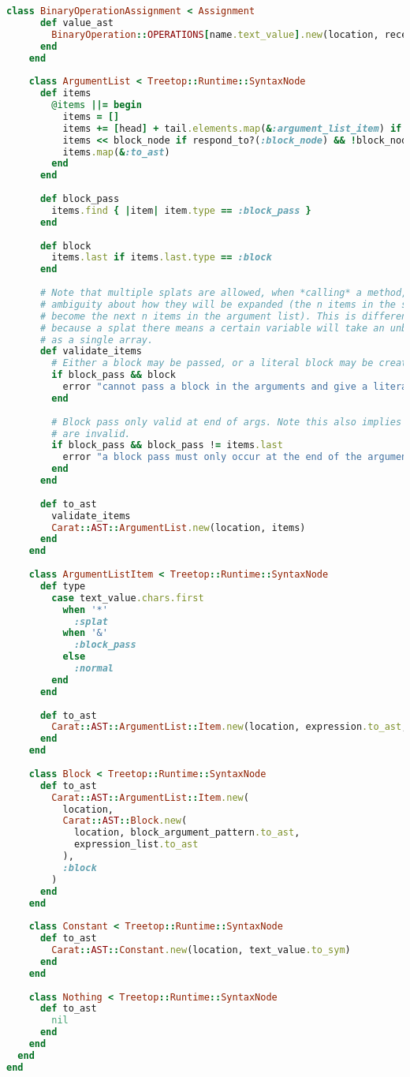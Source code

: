 \begin{lstlisting}[title={\small\Helvetica parser/nodes.rb},language=Ruby]
    class BinaryOperationAssignment < Assignment
      def value_ast
        BinaryOperation::OPERATIONS[name.text_value].new(location, receiver_ast, value.to_ast)
      end
    end
    
    class ArgumentList < Treetop::Runtime::SyntaxNode
      def items
        @items ||= begin
          items = []
          items += [head] + tail.elements.map(&:argument_list_item) if respond_to?(:head)
          items << block_node if respond_to?(:block_node) && !block_node.empty?
          items.map(&:to_ast)
        end
      end
      
      def block_pass
        items.find { |item| item.type == :block_pass }
      end
      
      def block
        items.last if items.last.type == :block
      end
      
      # Note that multiple splats are allowed, when *calling* a method, because there is no
      # ambiguity about how they will be expanded (the n items in the splat's expression will
      # become the next n items in the argument list). This is different to when defining a method
      # because a splat there means a certain variable will take an unbounded number of arguments
      # as a single array.
      def validate_items
        # Either a block may be passed, or a literal block may be created, but not both
        if block_pass && block
          error "cannot pass a block in the arguments and give a literal block at the same time"
        end
        
        # Block pass only valid at end of args. Note this also implies that multiple block passes
        # are invalid.
        if block_pass && block_pass != items.last
          error "a block pass must only occur at the end of the argument list"
        end
      end
      
      def to_ast
        validate_items
        Carat::AST::ArgumentList.new(location, items)
      end
    end
    
    class ArgumentListItem < Treetop::Runtime::SyntaxNode
      def type
        case text_value.chars.first
          when '*'
            :splat
          when '&'
            :block_pass
          else
            :normal
        end
      end
      
      def to_ast
        Carat::AST::ArgumentList::Item.new(location, expression.to_ast, type)
      end
    end
    
    class Block < Treetop::Runtime::SyntaxNode
      def to_ast
        Carat::AST::ArgumentList::Item.new(
          location,
          Carat::AST::Block.new(
            location, block_argument_pattern.to_ast,
            expression_list.to_ast
          ),
          :block
        )
      end
    end
    
    class Constant < Treetop::Runtime::SyntaxNode
      def to_ast
        Carat::AST::Constant.new(location, text_value.to_sym)
      end
    end
    
    class Nothing < Treetop::Runtime::SyntaxNode
      def to_ast
        nil
      end
    end
  end
end

\end{lstlisting}
